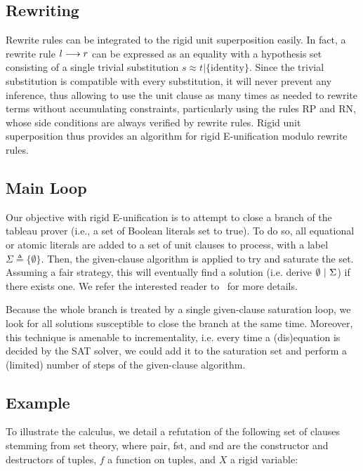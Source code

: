 \subsection{Rewriting}

Rewrite rules can be integrated to the rigid unit superposition easily. In fact,
a rewrite rule $l\longrightarrow{}r$ can be expressed as an equality with a hypothesis set
consisting of a single trivial substitution
$s\approx{}t|\{\text{identity}\}$. Since the trivial substitution is compatible
with every substitution, it will never prevent any inference, thus allowing to
use the unit clause as many times as needed to rewrite terms without
accumulating constraints, particularly using the rules RP and RN, whose side
conditions are always verified by rewrite rules. Rigid unit superposition thus
provides an algorithm for rigid E-unification modulo rewrite rules.

\subsection{Main Loop}

Our objective with rigid E-unification is to attempt to close a branch of the
tableau prover (i.e., a set of Boolean literals set to true). To do so, all
equational or atomic literals are added to a set of unit clauses to process,
with a label $\Sigma \triangleq \{ \emptyset \}$. Then, the given-clause
algorithm is applied to try and saturate the set. Assuming a fair strategy, this
will eventually find a solution (i.e. derive
$\emptyset ~|~ \Sigma$) if there exists one. We refer the
interested reader to~\cite{SS02} for more details.

Because the whole branch is treated by a single given-clause saturation loop, we
look for all solutions susceptible to close the branch at the same time.
Moreover, this technique is amenable to incrementality, i.e. every time a
(dis)equation is decided by the SAT solver, we could add it to the saturation
set and perform a (limited) number of steps of the given-clause algorithm.

\subsection{Example}

To illustrate the calculus, we detail a refutation of the following set of
clauses stemming from set theory, where pair, fst, and snd are the constructor
and destructors of tuples, $f$ a function on tuples, and $X$ a rigid variable:

